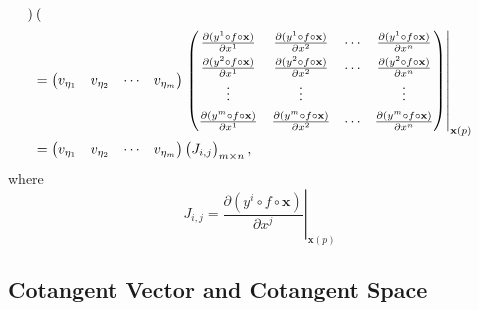 \documentclass{report}
\begin{document}
{\[\begin{aligned}
\begin{pmatrix}
            \end{pmatrix}\\
            &=
            \begin{pmatrix}
            v_{\eta_1}&v_{\eta_2}&\cdots&v_{\eta_m}
            \end{pmatrix}
            \renewcommand{\arraystretch}{1.5}
            \left.\begin{pmatrix}
                \frac{\partial(y^1 \circ f\circ\mathbf{x})}{\partial x^1}&\frac{\partial(y^1 \circ f\circ\mathbf{x})}{\partial x^2}&\cdots&\frac{\partial(y^1 \circ f\circ\mathbf{x})}{\partial x^n}\\
                \frac{\partial(y^2 \circ f\circ\mathbf{x})}{\partial x^1}&\frac{\partial(y^2 \circ f\circ\mathbf{x})}{\partial x^2}&\cdots&\frac{\partial(y^2 \circ f\circ\mathbf{x})}{\partial x^n}\\
                \vdots&\vdots&&\vdots\\
                \frac{\partial(y^m \circ f\circ\mathbf{x})}{\partial x^1}&\frac{\partial(y^m \circ f\circ\mathbf{x})}{\partial x^2}&\cdots&\frac{\partial(y^m \circ f\circ\mathbf{x})}{\partial x^n}
            \end{pmatrix}\right|_{\mathbf{x}(p)}
            \renewcommand{\arraystretch}{1}\\
            &=
            \begin{pmatrix}
            v_{\eta_1}&v_{\eta_2}&\cdots&v_{\eta_m}
            \end{pmatrix}
            \begin{pmatrix}
           J_{i,j}
           \end{pmatrix}_{m\times n},
        \end{aligned}
    \]
    where
    \[
        J_{i,j}=\left.\frac{\partial(y^i \circ f\circ\mathbf{x})}{\partial x^j}\right|_{\mathbf{x}(p)}
        \]
}

\subsection{Cotangent Vector and Cotangent Space}
\end{document}
